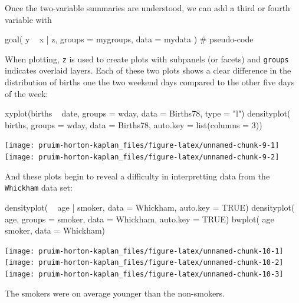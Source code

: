 Once the two-variable summaries are understood, we can add a third or
fourth variable with

\begin{Schunk}
\begin{Sinput}
goal( y ~ x | z, groups = mygroups, data = mydata )    # pseudo-code
\end{Sinput}
\end{Schunk}

\noindent
When plotting, \texttt{z} is used to create plots with subpanels (or
facets) and \texttt{groups} indicates overlaid layers. Each of these two
plots shows a clear difference in the distribution of births one the two
weekend days compared to the other five days of the week:

\begin{Schunk}
\begin{Sinput}
xyplot(births ~ date, groups = wday, data = Births78, type = "l")
densityplot( ~ births, groups = wday, data = Births78, auto.key = list(columns = 3))
\end{Sinput}


\begin{center}\texttt{[image: pruim-horton-kaplan\_files/figure-latex/unnamed-chunk-9-1]} \texttt{[image: pruim-horton-kaplan\_files/figure-latex/unnamed-chunk-9-2]} \end{center}

\end{Schunk}

And these plots begin to reveal a difficulty in interpretting data from
the \texttt{Whickham} data set:

\begin{Schunk}
\begin{Sinput}
densityplot( ~ age | smoker, data = Whickham, auto.key = TRUE)
densityplot( ~ age, groups = smoker, data = Whickham, auto.key = TRUE)
bwplot( age ~ smoker, data = Whickham)
\end{Sinput}


\begin{center}\texttt{[image: pruim-horton-kaplan\_files/figure-latex/unnamed-chunk-10-1]} \texttt{[image: pruim-horton-kaplan\_files/figure-latex/unnamed-chunk-10-2]} \texttt{[image: pruim-horton-kaplan\_files/figure-latex/unnamed-chunk-10-3]} \end{center}

\end{Schunk}

\noindent
The smokers were on average younger than the non-smokers.

